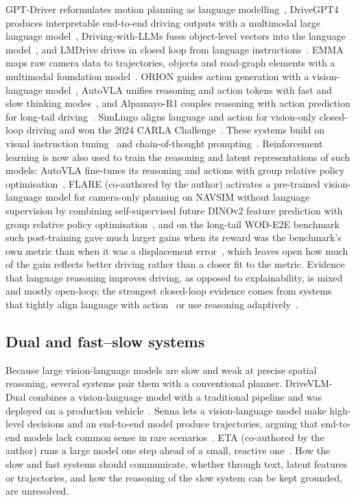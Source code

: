 GPT-Driver reformulates motion planning as language modelling~\cite{mao2023gptdriver}, DriveGPT4 produces interpretable end-to-end driving outputs with a multimodal large language model~\cite{xu2024drivegpt4}, Driving-with-LLMs fuses object-level vectors into the language model~\cite{chen2024drivingwithllms}, and LMDrive drives in closed loop from language instructions~\cite{shao2024lmdrive}. EMMA maps raw camera data to trajectories, objects and road-graph elements with a multimodal foundation model~\cite{hwang2025emma}. ORION guides action generation with a vision-language model~\cite{fu2025orion}, AutoVLA unifies reasoning and action tokens with fast and slow thinking modes~\cite{zhou2025autovla}, and Alpamayo-R1 couples reasoning with action prediction for long-tail driving~\cite{nvidia2025alpamayo}. SimLingo aligns language and action for vision-only closed-loop driving and won the 2024 CARLA Challenge~\cite{renz2025simlingo}. These systems build on visual instruction tuning~\cite{liu2023llava} and chain-of-thought prompting~\cite{wei2022cot}. Reinforcement learning is now also used to train the reasoning and latent representations of such models: AutoVLA fine-tunes its reasoning and actions with group relative policy optimisation~\cite{zhou2025autovla}, FLARE (co-authored by the author) activates a pre-trained vision-language model for camera-only planning on NAVSIM without language supervision by combining self-supervised future DINOv2 feature prediction with group relative policy optimisation~\cite{xie2026flare}, and on the long-tail WOD-E2E benchmark such post-training gave much larger gains when its reward was the benchmark's own metric than when it was a displacement error~\cite{xu2026wode2e}, which leaves open how much of the gain reflects better driving rather than a closer fit to the metric. Evidence that language reasoning improves driving, as opposed to explainability, is mixed and mostly open-loop; the strongest closed-loop evidence comes from systems that tightly align language with action~\cite{renz2025simlingo} or use reasoning adaptively~\cite{zhou2025autovla}.

\subsection{Dual and fast--slow systems}

Because large vision-language models are slow and weak at precise spatial reasoning, several systems pair them with a conventional planner. DriveVLM-Dual combines a vision-language model with a traditional pipeline and was deployed on a production vehicle~\cite{tian2024drivevlm}. Senna lets a vision-language model make high-level decisions and an end-to-end model produce trajectories, arguing that end-to-end models lack common sense in rare scenarios~\cite{jiang2026senna}. ETA (co-authored by the author) runs a large model one step ahead of a small, reactive one~\cite{hamdan2025eta}. How the slow and fast systems should communicate, whether through text, latent features or trajectories, and how the reasoning of the slow system can be kept grounded, are unresolved.

